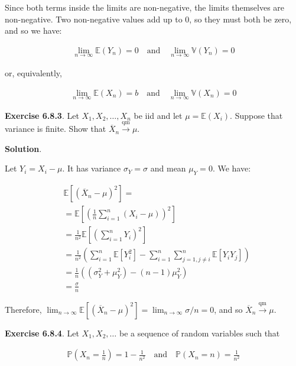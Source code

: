 Since both terms inside the limits are non-negative, the limits
themselves are non-negative. Two non-negative values add up to 0, so
they must both be zero, and so we have:

\begin{align*}\lim_{n \rightarrow \infty} \mathbb{E}(Y_{n}) = 0
\quad\mathrm{and}\quad 
\lim_{n \rightarrow \infty} \mathbb{V}(Y_{n}) = 0
\end{align*}

or, equivalently,

\begin{align*}\lim_{n \rightarrow \infty} \mathbb{E}(X_{n}) = b
\quad\mathrm{and}\quad 
\lim_{n \rightarrow \infty} \mathbb{V}(X_{n}) = 0
\end{align*}

\textbf{Exercise 6.8.3}. Let \(X_{1}, X_{2}, \dots, X_{n}\) be iid and let
\(\mu = \mathbb{E}(X_{i})\). Suppose that variance is finite. Show that
\(\overline{X}_{n} \xrightarrow{\text{qm}} \mu\).

\textbf{Solution}.

Let \(Y_{i} = X_{i} - \mu\). It has variance \(\sigma_Y = \sigma\) and mean
\(\mu_Y = 0\). We have:

\begin{align*}
& \mathbb{E}[(\overline{X}_{n} - \mu)^{2}] = \\
& = \mathbb{E}\left[\left(\frac{1}{n} \sum_{i=1}^{n} (X_{i} - \mu) \right)^{2}\right] \\
& = \frac{1}{n^{2}} \mathbb{E} \left[ \left(\sum_{i=1}^{n} Y_{i} \right)^{2} \right] \\
& = \frac{1}{n^{2}} \left( \sum_{i=1}^{n} \mathbb{E}[Y_{i}^{2}] - \sum_{i=1}^{n} \sum_{j=1, j \neq i}^{n} \mathbb{E}[Y_{i} Y_{j}] \right) \\
& = \frac{1}{n} \left( (\sigma_Y^{2} + \mu_Y^{2}) - (n-1) \mu_Y^{2} \right) \\
& = \frac{\sigma}{n}
\end{align*}

Therefore,
\(\lim _{n \rightarrow \infty} \mathbb{E}[(\overline{X}_{n} - \mu)^{2}] = \lim _{n \rightarrow \infty} \sigma / n = 0\),
and so \(\overline{X}_{n} \xrightarrow{\text{qm}} \mu\).

\textbf{Exercise 6.8.4}. Let \(X_{1}, X_{2}, \dots\) be a sequence of random
variables such that

\begin{align*}\mathbb{P}\left(X_{n} = \frac{1}{n}\right) = 1 - \frac{1}{n^{2}}
\quad\mathrm{and}\quad 
\mathbb{P}\left(X_{n} = n\right) = \frac{1}{n^{2}}
\end{align*}

